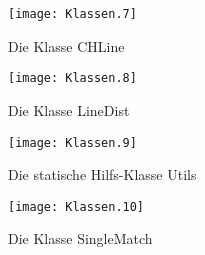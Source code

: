 \begin{appendix}
\begin{landscape}
 \begin{figure}	
	\texttt{[image: Klassen.7]}
	\caption{Die Klasse CHLine}
	\label{fig:UML_CHLine}
\end{figure}

 \begin{figure}	
	\texttt{[image: Klassen.8]}
	\caption{Die Klasse LineDist}
	\label{fig:UML_LineDist}
\end{figure}

\begin{figure}	
	\texttt{[image: Klassen.9]}
	\caption{Die statische Hilfs-Klasse Utils}
	\label{fig:UML_Utils}
\end{figure}

\begin{figure}	
	\texttt{[image: Klassen.10]}
	\caption{Die Klasse SingleMatch}
	\label{fig:UML_SingleMatch}
\end{figure}

\end{landscape}
  
  
 \printindex
 \setcounter{chapter}{5}



\listoffigures
 \end{appendix}


